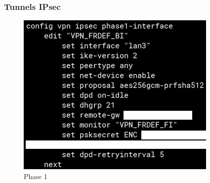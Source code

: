 \documentclass[french, a4paper]{beamer}
\begin{document}
\begin{frame}
    \frametitle{Tunnels IPsec}
    \begin{minipage}{0.5\textwidth}
        \begin{figure}[h!]
            \centering
            \includegraphics[width = \linewidth]{img/fgt-auxr/ipsec-phase1.png}
            \caption{Phase 1}%
            \label{fig:fgt-auxr/ipsec-phase1}
        \end{figure}
    \end{minipage}%
    \hfill
    \begin{minipage}{0.4\textwidth}
        \begin{figure}[h!]
            \centering

\end{figure}
\end{minipage}
\end{frame}
\end{document}
